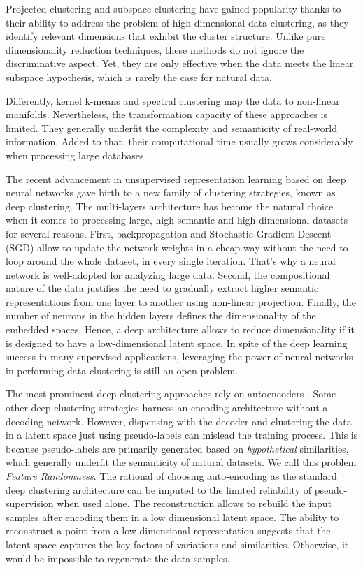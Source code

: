 \documentclass{article}
\begin{document}
Projected clustering \cite{paper82} and subspace clustering \cite{paper83} have gained popularity thanks to their ability to address the problem of high-dimensional data clustering, as they identify relevant dimensions that exhibit the cluster structure. Unlike pure dimensionality reduction techniques, these methods do not ignore the discriminative aspect. Yet, they are only effective when the data meets the linear subspace hypothesis, which is rarely the case for natural data. 

Differently, kernel k-means \cite{paper54} and spectral clustering \cite{paper12} map the data to non-linear manifolds. Nevertheless, the transformation capacity of these approaches is limited. They generally underfit the complexity and semanticity of real-world information. Added to that, their computational time usually grows considerably when processing large databases. 

The recent advancement in unsupervised representation learning \cite{paper17,paper5} based on deep neural networks gave birth to a new family of clustering strategies, known as deep clustering. The multi-layers architecture has become the natural choice when it comes to processing large, high-semantic and high-dimensional datasets for several reasons. First, backpropagation and Stochastic Gradient Descent (SGD) allow to update the network weights in a cheap way without the need to loop around the whole dataset, in every single iteration. That's why a neural network is well-adopted for analyzing large data. Second, the compositional nature of the data \cite{paper20} justifies the need to gradually extract higher semantic representations from one layer to another using non-linear projection. Finally, the number of neurons in the hidden layers defines the dimensionality of the embedded spaces. Hence, a deep architecture allows to reduce dimensionality if it is designed to have a low-dimensional latent space. In spite of the deep learning success in many supervised applications, leveraging the power of neural networks in performing data clustering is still an open problem.  



The most prominent deep clustering approaches rely on autoencoders \cite{paper27,paper28,paper29,paper30,paper31}. Some other deep clustering strategies harness an encoding architecture \cite{paper21,paper22,paper23,paper24,paper25,paper26} without a decoding network. However, dispensing with the decoder and clustering the data in a latent space just using pseudo-labels can mislead the training process. This is because pseudo-labels are primarily generated based on \textit{hypothetical} similarities, which generally underfit the semanticity of natural datasets. We call this problem \textit{Feature Randomness}. The rational of choosing auto-encoding as the standard deep clustering architecture can be imputed to the limited reliability of pseudo-supervision when used alone. The reconstruction allows to rebuild the input samples after encoding them in a low dimensional latent space. The ability to reconstruct a point from a low-dimensional representation suggests that the latent space captures the key factors of variations and similarities. Otherwise, it would be impossible to regenerate the data samples.
\end{document}
